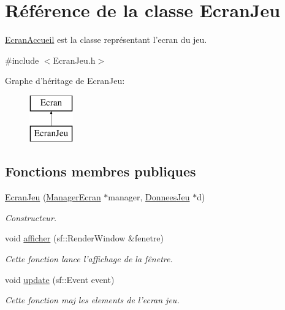\hypertarget{classEcranJeu}{\section{\-Référence de la classe \-Ecran\-Jeu}
\label{classEcranJeu}
}


\hyperlink{classEcranAccueil}{\-Ecran\-Accueil} est la classe représentant l'ecran du jeu.  




{\ttfamily \#include $<$\-Ecran\-Jeu.\-h$>$}

\-Graphe d'héritage de \-Ecran\-Jeu\-:\begin{figure}[H]
\begin{center}
\leavevmode
\includegraphics[height=2.000000cm]{classEcranJeu}
\end{center}
\end{figure}
\subsection*{\-Fonctions membres publiques}
\begin{DoxyCompactItemize}
\item 
\hypertarget{classEcranJeu_a9b55b8830b8a1b7261ab440d529f6b6c}{\hyperlink{classEcranJeu_a9b55b8830b8a1b7261ab440d529f6b6c}{\-Ecran\-Jeu} (\hyperlink{classManagerEcran}{\-Manager\-Ecran} $\ast$manager, \hyperlink{classDonneesJeu}{\-Donnees\-Jeu} $\ast$d)}\label{classEcranJeu_a9b55b8830b8a1b7261ab440d529f6b6c}

\begin{DoxyCompactList}\small\item\em \-Constructeur. \end{DoxyCompactList}\item 
void \hyperlink{classEcranJeu_a3181ea3bb30364a844c97c8436e89010}{afficher} (sf\-::\-Render\-Window \&fenetre)
\begin{DoxyCompactList}\small\item\em \-Cette fonction lance l'affichage de la fênetre. \end{DoxyCompactList}\item 
void \hyperlink{classEcranJeu_a8bfea524e61410dee2a2982d9b01bad4}{update} (sf\-::\-Event event)
\begin{DoxyCompactList}\small\item\em \-Cette fonction maj les elements de l'ecran jeu. \end{DoxyCompactList}\end{DoxyCompactItemize}


